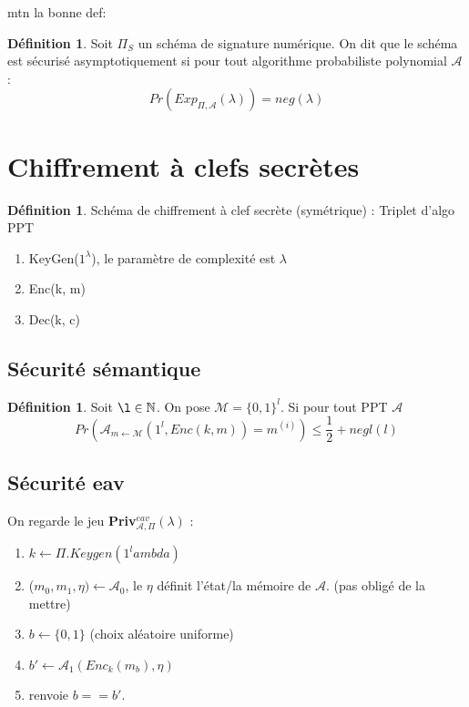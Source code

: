 \documentclass[12pt]{article}
\theoremstyle{plain}
\theoremstyle{definition}
\newtheorem{defn}[subsubsection]{D\'efinition}
\theoremstyle{remark}
\newcommand{\M}{\mathcal{M}}
\newcommand{\A}{\mathcal{A}}
\newcommand{\N}{\mathbb{N}}
\begin{document}
mtn la bonne def:
\begin{defn}
    Soit $\Pi_S$ un schéma de signature numérique. On dit que le schéma est sécurisé asymptotiquement si pour tout algorithme
    probabiliste polynomial $\mathcal{A}$ : $$Pr(Exp_{\Pi,\mathcal{A}}(\lambda))=neg(\lambda)$$
\end{defn}


\section{Chiffrement à clefs secrètes}

\begin{defn}
    Schéma de chiffrement à clef secrète (symétrique) : Triplet d'algo PPT
    \begin{enumerate}
        \item KeyGen($1^{\lambda}$), le paramètre de complexité est $\lambda$
        \item Enc(k, m)
        \item Dec(k, c)
    \end{enumerate}
\end{defn}

\subsection{Sécurité sémantique}
\begin{defn}
    Soit $\l\in\N$. On pose $\M=\{0,1\}^l$. Si pour tout PPT $\A$ 
    $$Pr(\A_{m\leftarrow\M}(1^l,Enc(k,m))=m^{(i)})\leq \frac{1}{2}+negl(l)$$
\end{defn}

\subsection{Sécurité eav}
On regarde le jeu \textbf{Priv$_{\A,\Pi}^{eav}(\lambda)$} :
\begin{enumerate}
    \item $k\leftarrow \Pi.Keygen(1^lambda)$
    \item ($m_0,m_1,\eta)\leftarrow\A_0$, le $\eta$ définit l'état/la mémoire de $\A$. (pas obligé de la mettre)
    \item $b\leftarrow\{0,1\}$ (choix aléatoire uniforme)
    \item $b'\leftarrow \A_1(Enc_k(m_b),\eta)$
    \item renvoie $b==b'$.
\end{enumerate}
\end{document}
